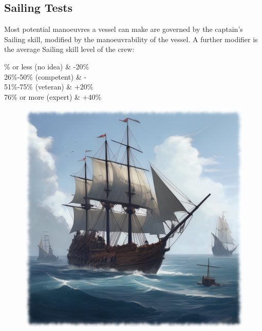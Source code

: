 \subsection{Sailing Tests}
Most potential manoeuvres a vessel can make are governed by the captain’s Sailing skill, modified by the manoeuvrability of the vessel. A further modifier is the average Sailing skill level of the crew:
\begin{table}[H]
\begin{center}
\begin{rpg-table}[|X|Y|]
        \% or less (no idea) & -20\%\\
	26\%-50\% (competent) & -\\
	51\%-75\% (veteran) & +20\%\\
	76\% or more (expert) & +40\%\\
	\hline
\end{rpg-table}
\end{center}
\end{table}

\begin{figure}
\begin{center}
  \includegraphics[scale=0.23]{img/ai-images/ships.png}
\end{center}
\end{figure}

